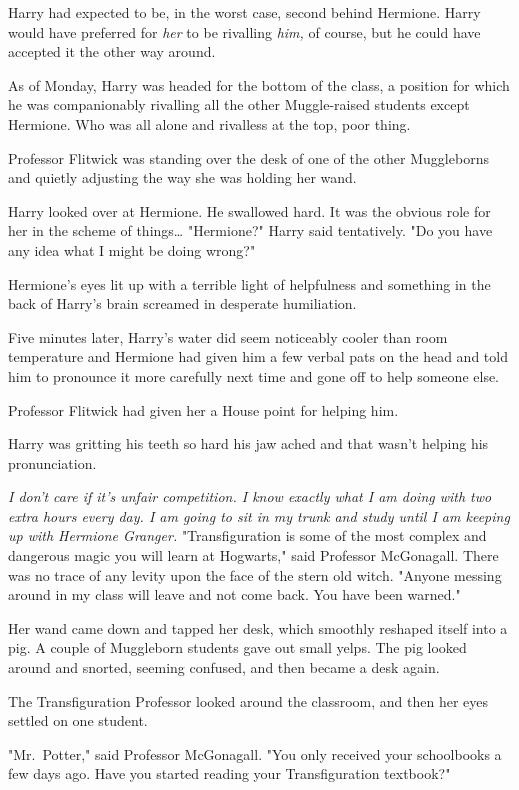Harry had expected to be, in the worst case, second behind Hermione. Harry 
would have preferred for \emph{her} to be rivalling \emph{him,} of course, but 
he could have accepted it the other way around.

As of Monday, Harry was headed for the bottom of the class, a position for 
which he was companionably rivalling all the other Muggle-raised students 
except Hermione. Who was all alone and rivalless at the top, poor thing.

Professor Flitwick was standing over the desk of one of the other Muggleborns 
and quietly adjusting the way she was holding her wand.

Harry looked over at Hermione. He swallowed hard. It was the obvious role for 
her in the scheme of things{\ldots} "Hermione?" Harry said tentatively. "Do you 
have any idea what I might be doing wrong?"

Hermione's eyes lit up with a terrible light of helpfulness and something in 
the back of Harry's brain screamed in desperate humiliation.

Five minutes later, Harry's water did seem noticeably cooler than room 
temperature and Hermione had given him a few verbal pats on the head and told 
him to pronounce it more carefully next time and gone off to help someone else.

Professor Flitwick had given her a House point for helping him.

Harry was gritting his teeth so hard his jaw ached and that wasn't helping his 
pronunciation.

\emph{I don't care if it's unfair competition. I know exactly what I am doing 
with two extra hours every day. I am going to sit in my trunk and study until I 
am keeping up with Hermione Granger.}
\sbreak
"Transfiguration is some of the most complex and dangerous magic you will learn 
at Hogwarts," said Professor McGonagall. There was no trace of any levity upon 
the face of the stern old witch. "Anyone messing around in my class will leave 
and not come back. You have been warned."

Her wand came down and tapped her desk, which smoothly reshaped itself into a 
pig. A couple of Muggleborn students gave out small yelps. The pig looked 
around and snorted, seeming confused, and then became a desk again.

The Transfiguration Professor looked around the classroom, and then her eyes 
settled on one student.

"Mr.~Potter," said Professor McGonagall. "You only received your schoolbooks a 
few days ago. Have you started reading your Transfiguration textbook?"

